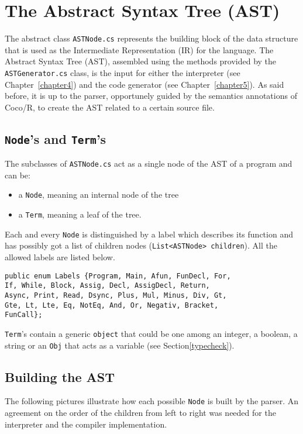 \chapter{\label{chapter3} The Abstract Syntax Tree (AST)}

The abstract class \texttt{ASTNode.cs} represents the building block of the data structure that is used as the Intermediate Representation (IR) for the \fwap language. The Abstract Syntax Tree (AST), assembled using the methods provided by the \texttt{ASTGenerator.cs} class, is the input for either the interpreter (see Chapter~\ref{chapter4}) and the \fsharp code generator (see Chapter~\ref{chapter5}). As said before, it is up to the parser, opportunely guided by the semantics annotations of Coco/R, to create the AST related to a certain \fwap source file.

\section{\texttt{Node}'s and \texttt{Term}'s}

The subclasses of \texttt{ASTNode.cs} act as a single node of the AST of a program and can be:
\begin{itemize}
	\item a \texttt{Node}, meaning an internal node of the tree 
	\item a \texttt{Term}, meaning a leaf of the tree.
\end{itemize}

Each and every \texttt{Node} is distinguished by a label which describes its function and has possibly got a list of children nodes (\texttt{List<ASTNode> children}). All the allowed labels are listed below.\\

\begin{lstlisting}[caption=Labels for \texttt{Node}s.]
public enum Labels {Program, Main, Afun, FunDecl, For,
If, While, Block, Assig, Decl, AssigDecl, Return, 
Async, Print, Read, Dsync, Plus, Mul, Minus, Div, Gt,
Gte, Lt, Lte, Eq, NotEq, And, Or, Negativ, Bracket, 
FunCall};
\end{lstlisting}

\texttt{Term}'s contain a generic \texttt{object} that could be one among an integer, a boolean, a string or an \texttt{Obj} that acts as a variable (see Section\ref{typecheck}).

\section{Building the AST}

The following pictures illustrate how each possible \texttt{Node} is built by the parser. An agreement on the order of the children from left to right was needed for the interpreter and the \fsharp compiler implementation.